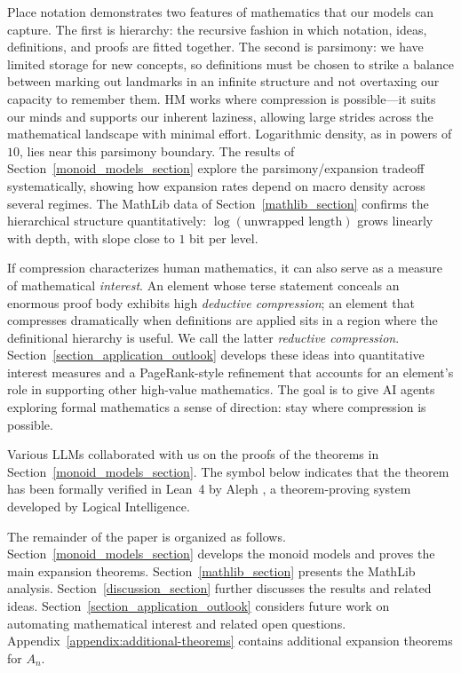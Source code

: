 \documentclass[12pt]{amsart}
\theoremstyle{definition}
\theoremstyle{remark}
\begin{document}
Place notation demonstrates two features of mathematics that our models can capture.
The first is hierarchy: the recursive fashion in which notation, ideas, definitions, and proofs are fitted together.
The second is parsimony: we have limited storage for new concepts, so definitions must be chosen to strike a balance between marking out landmarks in an infinite structure and not overtaxing our capacity to remember them.
HM works where compression is possible---it suits our minds and supports our inherent laziness, allowing large strides across the mathematical landscape with minimal effort.
Logarithmic density, as in powers of $10$, lies near this parsimony boundary.
The results of Section~\ref{monoid_models_section} explore the parsimony/expansion tradeoff systematically, showing how expansion rates depend on macro density across several regimes.
The MathLib data of Section~\ref{mathlib_section} confirms the hierarchical structure quantitatively: $\log(\text{unwrapped length})$ grows linearly with depth, with slope close to $1$ bit per level.

If compression characterizes human mathematics, it can also serve as a measure of mathematical \emph{interest}.
An element whose terse statement conceals an enormous proof body exhibits high \emph{deductive compression}; an element that compresses dramatically when definitions are applied sits in a region where the definitional hierarchy is useful. We call the latter \emph{reductive compression}.
Section~\ref{section_application_outlook} develops these ideas into quantitative interest measures and a PageRank-style refinement \cite{brin1998anatomy} that accounts for an element's role in supporting other high-value mathematics.
The goal is to give AI agents exploring formal mathematics a sense of direction: stay where compression is possible.

Various LLMs collaborated with us on the proofs of the theorems in Section~\ref{monoid_models_section}.
The \leanproof{} symbol below indicates that the theorem has been formally verified in Lean~4 by Aleph \cite{Aleph}, a theorem-proving system developed by Logical Intelligence.

The remainder of the paper is organized as follows.
Section~\ref{monoid_models_section} develops the monoid models and proves the main expansion theorems.
Section~\ref{mathlib_section} presents the MathLib analysis.
Section~\ref{discussion_section} further discusses the results and related ideas.
Section~\ref{section_application_outlook} considers future work on automating mathematical interest and related open questions.
Appendix~\ref{appendix:additional-theorems} contains additional expansion theorems for $A_n$.
\end{document}
